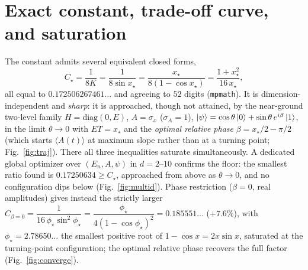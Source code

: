 \documentclass[aps,pra,twocolumn,superscriptaddress,nofootinbib,longbibliography]{revtex4-2}
\newcommand{\Ctrue}{C_{\star}}
\newcommand{\xstar}{x_{\star}}
\newcommand{\mean}[1]{\langle #1 \rangle}
\begin{document}
\section{Exact constant, trade-off curve, and saturation}
\label{sec:constant}
The constant admits several equivalent closed forms,
\begin{equation}
\Ctrue=\frac{1}{8K}=\frac{1}{8\sin\xstar}=\frac{\xstar}{8(1-\cos\xstar)}=\frac{1+\xstar^2}{16\,\xstar},
\end{equation}
all equal to $0.172506267461\ldots$ and agreeing to $52$ digits (\texttt{mpmath}). It is dimension-independent and \emph{sharp}: it is approached,
though not attained, by the near-ground two-level family
$H=\mathrm{diag}(0,E)$, $A=\sigma_x$ ($\sigma_A=1$),
$\ket{\psi}=\cos\theta\ket0+\sin\theta\,e^{i\beta}\ket1$, in the limit $\theta\to0$ with $ET=\xstar$ and the
\emph{optimal relative phase} $\beta=\xstar/2-\pi/2$ (which starts $\mean{A(t)}$ at maximum slope rather than
at a turning point; Fig.~\ref{fig:traj}). There all three inequalities saturate simultaneously. A dedicated global optimizer over
$(E_n,A,\psi)$ in $d=2$--$10$ confirms the floor: the smallest ratio found is
$0.17250634\ge\Ctrue$, approached from above as $\theta\to0$, and no configuration dips below
(Fig.~\ref{fig:multid}). Phase restriction ($\beta=0$, real amplitudes) gives instead the strictly larger
$C_{\beta=0}=\dfrac{1}{16\,\phi_\star\sin^2\phi_\star}=\dfrac{\phi_\star}{4(1-\cos\phi_\star)^2}=0.185551\ldots$
($+7.6\%$), with $\phi_\star=2.78650\ldots$ the smallest positive root of $1-\cos x=2x\sin x$, saturated at the
turning-point configuration; the optimal relative phase recovers the full factor (Fig.~\ref{fig:converge}).
\end{document}
